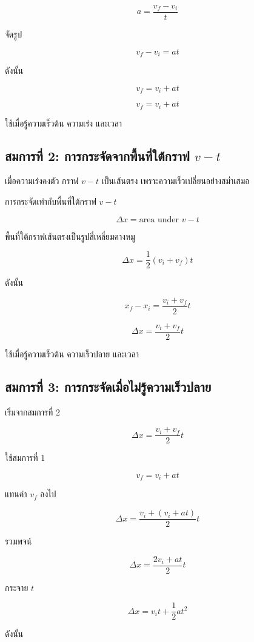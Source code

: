 \[
a=\frac{v_f-v_i}{t}
\]

จัดรูป

\[
v_f-v_i=at
\]

ดังนั้น

\[
v_f=v_i+at
\]

\begin{tcolorbox}[title=สมการที่ 1]
\[
v_f=v_i+at
\]

ใช้เมื่อรู้ความเร็วต้น ความเร่ง และเวลา
\end{tcolorbox}

\subsection{สมการที่ 2: การกระจัดจากพื้นที่ใต้กราฟ $v-t$}

เมื่อความเร่งคงตัว กราฟ $v-t$ เป็นเส้นตรง เพราะความเร็วเปลี่ยนอย่างสม่ำเสมอ

การกระจัดเท่ากับพื้นที่ใต้กราฟ $v-t$

\[
\Delta x=\text{area under }v-t
\]

พื้นที่ใต้กราฟเส้นตรงเป็นรูปสี่เหลี่ยมคางหมู

\[
\Delta x=\frac{1}{2}(v_i+v_f)t
\]

ดังนั้น

\[
x_f-x_i=\frac{v_i+v_f}{2}t
\]

\begin{tcolorbox}[title=สมการที่ 2]
\[
\Delta x=\frac{v_i+v_f}{2}t
\]

ใช้เมื่อรู้ความเร็วต้น ความเร็วปลาย และเวลา
\end{tcolorbox}

\subsection{สมการที่ 3: การกระจัดเมื่อไม่รู้ความเร็วปลาย}

เริ่มจากสมการที่ 2

\[
\Delta x=\frac{v_i+v_f}{2}t
\]

ใช้สมการที่ 1

\[
v_f=v_i+at
\]

แทนค่า $v_f$ ลงไป

\[
\Delta x=\frac{v_i+(v_i+at)}{2}t
\]

รวมพจน์

\[
\Delta x=\frac{2v_i+at}{2}t
\]

กระจาย $t$

\[
\Delta x=v_it+\frac{1}{2}at^2
\]

ดังนั้น

